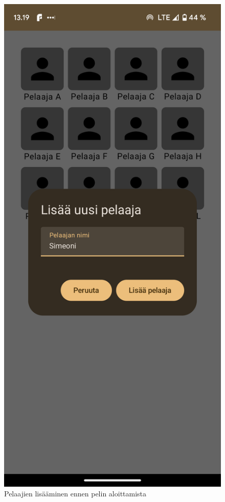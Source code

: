 \begin{figure}[h!]
\begin{minipage}[t]{.3\textwidth}
            \caption{Pelaajien lisääminen ennen pelin aloittamista}
            \label{fig:screenshot-add-players}
      \end{minipage}
      \begin{minipage}[t]{.3\textwidth}
            \includegraphics[width=\textwidth]{figures/screenshot-add-player.png}

\end{minipage}
\end{figure}
